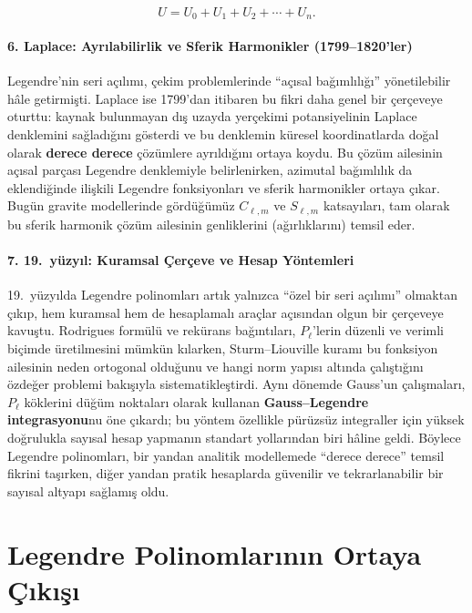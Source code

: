 \[
U = U_0 + U_1 + U_2 + \cdots + U_n.
\]


\paragraph{6. Laplace: Ayrılabilirlik ve Sferik Harmonikler (1799--1820'ler)}
Legendre’nin seri açılımı, çekim problemlerinde ``açısal bağımlılığı'' yönetilebilir hâle getirmişti.
Laplace ise 1799’dan itibaren bu fikri daha genel bir çerçeveye oturttu:
kaynak bulunmayan dış uzayda yerçekimi potansiyelinin Laplace denklemini sağladığını gösterdi ve
bu denklemin küresel koordinatlarda doğal olarak \textbf{derece derece }çözümlere ayrıldığını ortaya koydu.
Bu çözüm ailesinin açısal parçası Legendre denklemiyle belirlenirken, azimutal bağımlılık da eklendiğinde ilişkili Legendre fonksiyonları ve sferik harmonikler ortaya çıkar.
Bugün gravite modellerinde gördüğümüz $C_{\ell,m}$ ve $S_{\ell,m}$ katsayıları, tam olarak bu sferik harmonik çözüm ailesinin genliklerini (ağırlıklarını) temsil eder.



\paragraph{7. 19.\ yüzyıl: Kuramsal Çerçeve ve Hesap Yöntemleri}
19.\ yüzyılda Legendre polinomları artık yalnızca ``özel bir seri açılımı'' olmaktan çıkıp,
hem kuramsal hem de hesaplamalı araçlar açısından olgun bir çerçeveye kavuştu.
Rodrigues formülü ve rekürans bağıntıları, $P_\ell$’lerin düzenli ve verimli biçimde üretilmesini mümkün kılarken,
Sturm--Liouville kuramı bu fonksiyon ailesinin neden ortogonal olduğunu ve hangi norm yapısı altında çalıştığını
özdeğer problemi bakışıyla sistematikleştirdi.
Aynı dönemde Gauss’un çalışmaları, $P_\ell$ köklerini düğüm noktaları olarak kullanan
\textbf{Gauss--Legendre integrasyonu}nu öne çıkardı; bu yöntem özellikle pürüzsüz integraller için
yüksek doğrulukla sayısal hesap yapmanın standart yollarından biri hâline geldi.
Böylece Legendre polinomları, bir yandan analitik modellemede ``derece derece'' temsil fikrini taşırken,
diğer yandan pratik hesaplarda güvenilir ve tekrarlanabilir bir sayısal altyapı sağlamış oldu.


\newpage
\section{Legendre Polinomlarının Ortaya Çıkışı}

